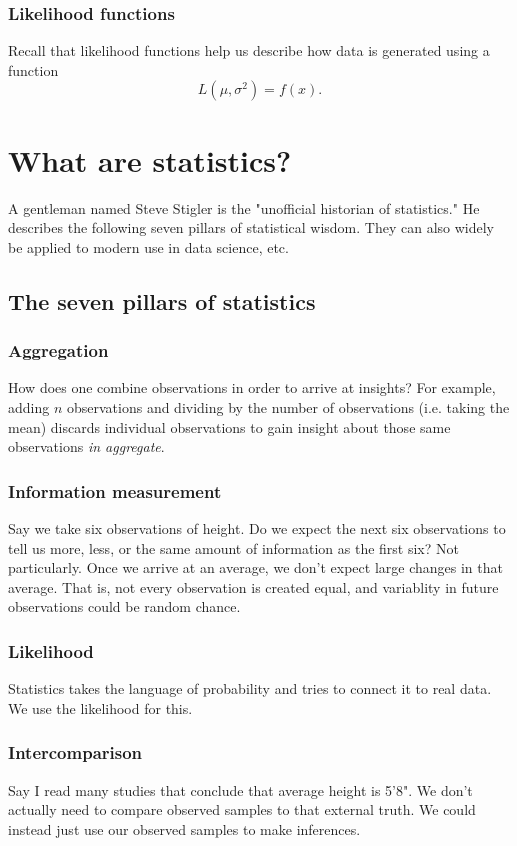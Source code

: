 \documentclass[titlepage, 12pt, leqno]{article}
\begin{document}
\subsubsection{Likelihood functions}
Recall that likelihood functions help us describe how data is generated using
a function
\[
L(\mu, \sigma^{2}) = f(x).
\]
\pagebreak
\section{What are statistics?}
A gentleman named Steve Stigler is the "unofficial historian of statistics." He
describes the following seven pillars of statistical wisdom. They can also
widely be applied to modern use in data science, etc.

\subsection{The seven pillars of statistics}
\subsubsection{Aggregation}
How does one combine observations in order to arrive at insights? For example,
adding $n$ observations and dividing by the number of observations (i.e. taking
the mean) discards individual observations to gain insight about those same
observations \textit{in aggregate}.

\subsubsection{Information measurement}
Say we take six observations of height. Do we expect the next six observations
to tell us more, less, or the same amount of information as the first six? Not
particularly. Once we arrive at an average, we don't expect large changes in
that average. That is, not every observation is created equal, and variablity
in future observations could be random chance.

\subsubsection{Likelihood}
Statistics takes the language of probability and tries to connect it to real
data. We use the likelihood for this.

\subsubsection{Intercomparison}
Say I read many studies that conclude that average height is 5'8". We don't
actually need to compare observed samples to that external truth. We could 
instead just use our observed samples to make inferences.
\end{document}

